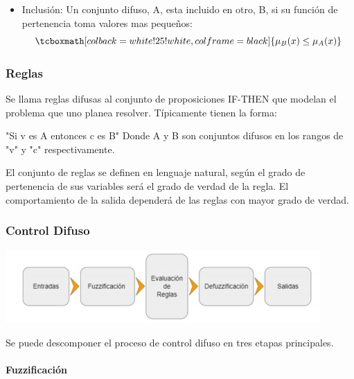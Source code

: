 \begin{itemize}
    \item Inclusión:  \hfill  
    Un conjunto difuso, A, esta incluido en otro, B, si su función de pertenencia toma valores mas pequeños: 
    \begin{equation}
    \tcboxmath[colback=white!25!white,colframe=black]
    {\mu_B (x) \leq \mu_A (x)}  
    \end{equation}
    
\end{itemize}


\subsubsection{Reglas}

Se llama reglas difusas al conjunto de proposiciones IF-THEN que modelan el problema que uno planea resolver. Típicamente tienen la forma: \par
\bigbreak
    "Si v es A entonces c es B"
\bigbreak
Donde A y B son conjuntos difusos en los rangos de "v" y "c" respectivamente.
\bigbreak

El conjunto de reglas se definen en lenguaje natural, según el grado de pertenencia de sus variables será el grado de verdad de la regla. El comportamiento de la salida dependerá de las reglas con mayor grado de verdad.\par

\subsubsection{Control Difuso}

\begin{center}
    \includegraphics[scale=0.7]{Tesis/Capitulos/02_MARCO_TEORICO/img/etapas.png}
\end{center}

Se puede descomponer el proceso de control difuso en tres etapas principales.\par

\paragraph{Fuzzificación} \label{fuzzymarker}

